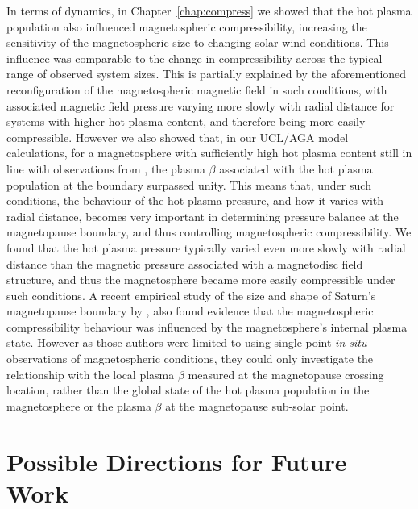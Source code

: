 In terms of dynamics, in Chapter~\ref{chap:compress} we showed that the hot plasma population also influenced magnetospheric compressibility, increasing the sensitivity of the magnetospheric size to changing solar wind conditions. This influence was comparable to the change in compressibility across the typical range of observed system sizes. This is partially explained by the aforementioned reconfiguration of the magnetospheric magnetic field in such conditions, with associated magnetic field pressure varying more slowly with radial distance for systems with higher hot plasma content, and therefore being more easily compressible. However we also showed that, in our UCL/AGA model calculations, for a magnetosphere with sufficiently high hot plasma content still in line with observations from \citet{sergis2007}, the plasma $\beta$ associated with the hot plasma population at the boundary surpassed unity. This means that, under such conditions, the behaviour of the hot plasma pressure, and how it varies with radial distance, becomes very important in determining pressure balance at the magnetopause boundary, and thus controlling magnetospheric compressibility. We found that the hot plasma pressure typically varied even more slowly with radial distance than the magnetic pressure associated with a magnetodisc field structure, and thus the magnetosphere became more easily compressible under such conditions. A recent empirical study of the size and shape of Saturn's magnetopause boundary by  \citet{pilkington2015}, also found evidence that the magnetospheric compressibility behaviour was influenced by the magnetosphere's internal plasma state. However as those authors were limited to using single-point \textit{in situ} observations of magnetospheric conditions, they could only investigate the relationship with the local plasma $\beta$ measured at the magnetopause crossing location, rather than the global state of the hot plasma population in the magnetosphere or the plasma $\beta$ at the magnetopause sub-solar point.

\section{Possible Directions for Future Work}
